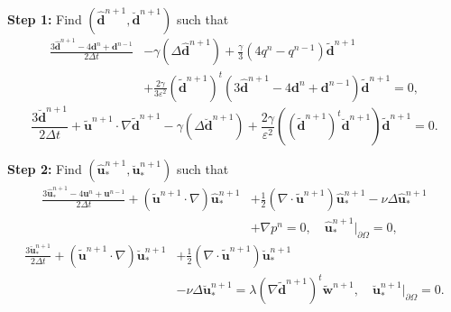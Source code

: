 \documentclass[12pt,reqno]{amsart}
\numberwithin{equation}{section}
\newcommand{\uu}{\mathrm{\textbf{u}}}
\newcommand{\dd}{\mathrm{\textbf{d}}}
\newcommand{\ww}{\mathrm{\textbf{w}}}
\begin{document}
\textbf{Step 1:} Find $(\hat{\dd}^{n+1},\breve{\dd}^{n+1})$ such that
\begin{equation}\label{PCSAV Subproblem 1}
\begin{split}
\frac{3\hat{\dd}^{n+1}-4\dd^n+\dd^{n-1}}{2\Delta t}&-\gamma\left( \Delta \hat{\dd}^{n+1}\right)
+\frac{\gamma}{3}\left(4q^n-q^{n-1}\right)\tilde{\dd}^{n+1}\\
&+\frac{2\gamma}{3\varepsilon^2}\left(\tilde{\dd}^{n+1}\right)^t\left(3\hat{\dd}^{n+1}-4\dd^n+\dd^{n-1}\right)\tilde{\dd}^{n+1}=0,
\end{split}
\end{equation}
\begin{equation}\label{PCSAV Subproblem 2}
\frac{3\breve{\dd}^{n+1}}{2\Delta t}+ \tilde{\uu}^{n+1}\cdot\nabla \tilde{\dd}^{n+1}-\gamma\left( \Delta \breve{\dd}^{n+1}\right)+
\frac{2\gamma}{\varepsilon^2}\left(\left(\tilde{\dd}^{n+1}\right)^t\breve{\dd}^{n+1}\right)\tilde{\dd}^{n+1}=0.
\end{equation}

\textbf{Step 2:} Find $(\hat{\uu}_*^{n+1},\breve{\uu}_*^{n+1})$ such that
\begin{equation}\label{PCSAV Subproblem 3}
\begin{split}
\frac{3\hat{\uu}_*^{n+1}-4\uu^n+\uu^{n-1}}{2\Delta t} + \left(\tilde{\uu}^{n+1}\cdot\nabla\right)\hat{\uu}_*^{n+1}&+ \frac{1}{2}\left(\nabla\cdot \tilde{\uu}^{n+1}\right)\hat{\uu}_*^{n+1}-\nu\Delta\hat{\uu}_*^{n+1}\\
&+\nabla p^n = 0,\quad\hat{\uu}_*^{n+1}|_{\partial\Omega}=0,
\end{split}
\end{equation}
\begin{equation}\label{PCSAV Subproblem 4}
\begin{split}
\frac{3\breve{\uu}_*^{n+1}}{2\Delta t} + \left(\tilde{\uu}^{n+1}\cdot\nabla\right)\breve{\uu}_*^{n+1} &+ \frac{1}{2}\left(\nabla\cdot \tilde{\uu}^{n+1}\right)\breve{\uu}_*^{n+1}
\\
&-\nu\Delta\breve{\uu}_*^{n+1}= \lambda\left(\nabla\tilde{\dd}^{n+1}\right)^t\tilde{\ww}^{n+1},\quad\breve{\uu}_*^{n+1}|_{\partial\Omega}=0.
\end{split}
\end{equation}
\end{document}
